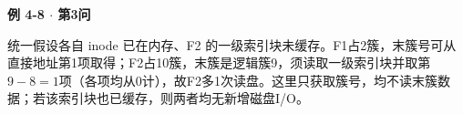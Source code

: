 {\color{ink}\bfseries 例 4-8 \(\cdot \) 第3问}\par\vspace{1bp}统一假设各自 inode 已在内存、F2 的一级索引块未缓存。F1占2簇，末簇号可从直接地址第1项取得；F2占10簇，末簇是逻辑簇9，须读取一级索引块并取第\(9-8=\allowbreak{}1\)项（各项均从0计），故F2多1次读盘。这里只获取簇号，均不读末簇数据；若该索引块也已缓存，则两者均无新增磁盘I/\allowbreak{}O。
